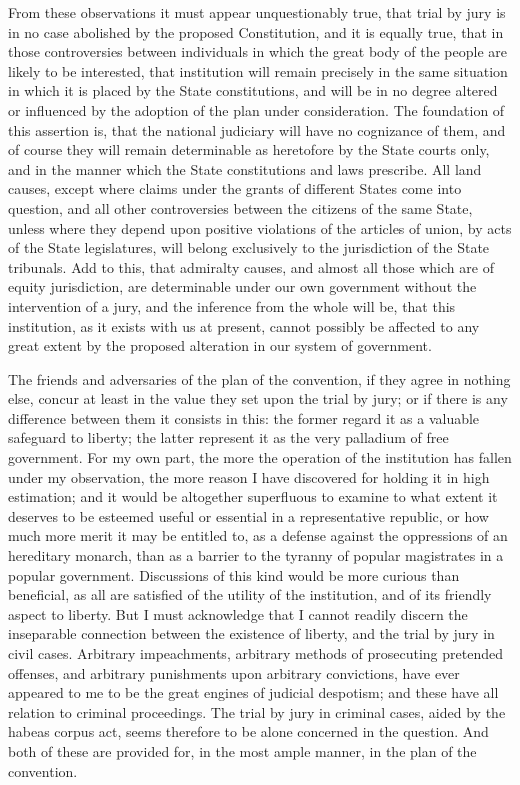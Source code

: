 From these observations it must appear unquestionably true, that trial by jury is in no case abolished by the proposed Constitution, and it is equally true, that in those controversies between individuals in which the great body of the people are likely to be interested, that institution will remain precisely in the same situation in which it is placed by the State constitutions, and will be in no degree altered or influenced by the adoption of the plan under consideration. The foundation of this assertion is, that the national judiciary will have no cognizance of them, and of course they will remain determinable as heretofore by the State courts only, and in the manner which the State constitutions and laws prescribe. All land causes, except where claims under the grants of different States come into question, and all other controversies between the citizens of the same State, unless where they depend upon positive violations of the articles of union, by acts of the State legislatures, will belong exclusively to the jurisdiction of the State tribunals. Add to this, that admiralty causes, and almost all those which are of equity jurisdiction, are determinable under our own government without the intervention of a jury, and the inference from the whole will be, that this institution, as it exists with us at present, cannot possibly be affected to any great extent by the proposed alteration in our system of government.

The friends and adversaries of the plan of the convention, if they agree in nothing else, concur at least in the value they set upon the trial by jury; or if there is any difference between them it consists in this: the former regard it as a valuable safeguard to liberty; the latter represent it as the very palladium of free government. For my own part, the more the operation of the institution has fallen under my observation, the more reason I have discovered for holding it in high estimation; and it would be altogether superfluous to examine to what extent it deserves to be esteemed useful or essential in a representative republic, or how much more merit it may be entitled to, as a defense against the oppressions of an hereditary monarch, than as a barrier to the tyranny of popular magistrates in a popular government. Discussions of this kind would be more curious than beneficial, as all are satisfied of the utility of the institution, and of its friendly aspect to liberty. But I must acknowledge that I cannot readily discern the inseparable connection between the existence of liberty, and the trial by jury in civil cases. Arbitrary impeachments, arbitrary methods of prosecuting pretended offenses, and arbitrary punishments upon arbitrary convictions, have ever appeared to me to be the great engines of judicial despotism; and these have all relation to criminal proceedings. The trial by jury in criminal cases, aided by the habeas corpus act, seems therefore to be alone concerned in the question. And both of these are provided for, in the most ample manner, in the plan of the convention.

